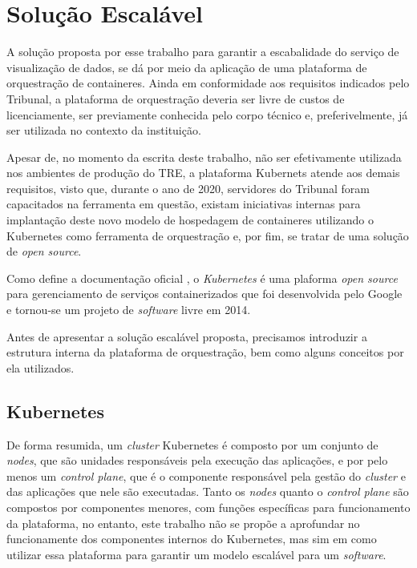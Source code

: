 \section{Solução Escalável}

A solução proposta por esse trabalho para garantir a escabalidade do serviço de visualização de dados, se dá por meio da aplicação de uma plataforma de orquestração de containeres. Ainda em conformidade aos requisitos indicados pelo Tribunal, a plataforma de orquestração deveria ser livre de custos de licenciamente, ser previamente conhecida pelo corpo técnico e, preferivelmente, já ser utilizada no contexto da instituição.

Apesar de,  no momento da escrita deste trabalho, não ser efetivamente utilizada nos ambientes de produção do TRE, a plataforma Kubernets atende aos demais requisitos, visto que, durante o ano de 2020, servidores do Tribunal foram capacitados na ferramenta em questão, existam iniciativas internas para implantação deste novo modelo de hospedagem de containeres utilizando o Kubernetes como ferramenta de orquestração e, por fim, se tratar de uma solução de \textit{open source}.

Como define a documentação oficial \cite{k8sDoc}, o \textit{Kubernetes} é uma plaforma \textit{open source} para gerenciamento de serviços containerizados que foi desenvolvida pelo Google e tornou-se um projeto de \textit{software} livre em 2014.

Antes de apresentar a solução escalável proposta, precisamos introduzir a estrutura interna da plataforma de orquestração, bem como alguns conceitos por ela utilizados.

\subsection{Kubernetes}

De forma resumida, um \textit{cluster} Kubernetes é composto por um conjunto de \textit{nodes}, que são unidades responsáveis pela execução das aplicações, e por pelo menos um \textit{control plane}, que é o componente responsável pela gestão do \textit{cluster} e das aplicações que nele são executadas. Tanto os \textit{nodes} quanto o \textit{control plane} são compostos por componentes menores, com funções específicas para funcionamento da plataforma, no entanto, este trabalho não se propõe a aprofundar no funcionamente dos componentes internos do Kubernetes, mas sim em como utilizar essa plataforma para garantir um modelo escalável para um \textit{software}.

